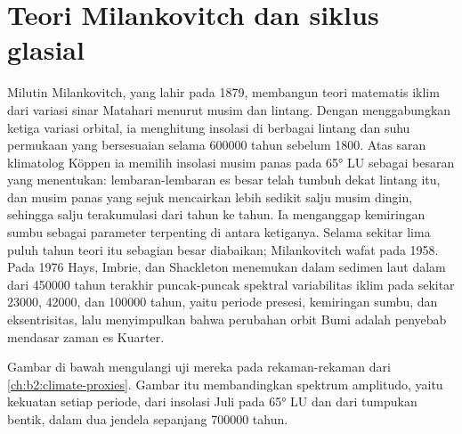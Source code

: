 \section{Teori Milankovitch dan siklus glasial}\label{sec:b2:orbital-forcing:theory}

\begin{history}
Milutin Milankovitch, yang lahir pada 1879, membangun teori matematis iklim dari variasi sinar Matahari menurut musim dan lintang. Dengan menggabungkan ketiga variasi orbital,
ia menghitung insolasi di berbagai lintang dan suhu permukaan yang bersesuaian selama
\num{600000} tahun sebelum 1800. Atas saran klimatolog Köppen ia memilih insolasi musim panas
pada \ang{65} LU sebagai besaran yang menentukan: lembaran-lembaran es besar telah tumbuh dekat
lintang itu, dan musim panas yang sejuk mencairkan lebih sedikit salju musim dingin, sehingga salju terakumulasi dari tahun ke
tahun. Ia menganggap kemiringan sumbu sebagai parameter terpenting di antara ketiganya. Selama sekitar lima puluh tahun
teori itu sebagian besar diabaikan; Milankovitch wafat pada 1958. Pada 1976 Hays, Imbrie, dan Shackleton
menemukan dalam sedimen laut dalam dari \num{450000} tahun terakhir puncak-puncak spektral variabilitas iklim
pada sekitar \num{23000}, \num{42000}, dan \num{100000} tahun, yaitu periode presesi, kemiringan sumbu, dan
eksentrisitas, lalu menyimpulkan bahwa perubahan orbit Bumi adalah penyebab mendasar
zaman es Kuarter.
\end{history}

Gambar di bawah mengulangi uji mereka pada rekaman-rekaman dari \cref{ch:b2:climate-proxies}. Gambar itu membandingkan
spektrum amplitudo, yaitu kekuatan setiap periode, dari insolasi Juli pada \ang{65} LU dan dari
tumpukan bentik, dalam dua jendela sepanjang \num{700000} tahun.

